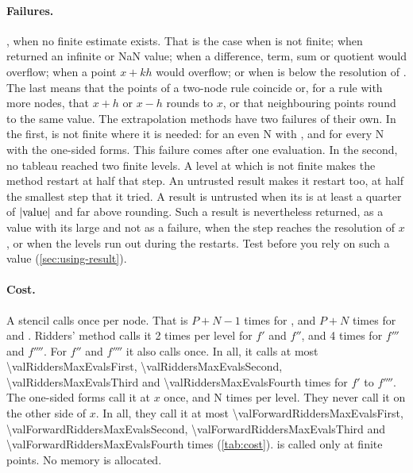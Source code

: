 \paragraph{Failures.} , when no finite estimate exists. That is the case when  is not
finite; when  returned an infinite or NaN value; when a difference, term, sum or quotient would overflow; when
a point $x + k h$ would overflow; or when  is below the resolution of . The last means that the points
of a two-node rule coincide or, for a rule with more nodes, that $x + h$ or $x - h$ rounds to $x$, or that
neighbouring points round to the same value. The extrapolation methods have two failures of their own. In the first,
 is not finite where it is needed: for an even N with , and for every N with the one-sided
forms. This failure comes after one evaluation. In the second, no tableau reached two finite levels. A level at which
 is not finite makes the method restart at half that step. An untrusted result makes it restart too, at half
the smallest step that it tried. A result is untrusted when its  is at least a quarter of
$\lvert \text{value} \rvert$ and far above rounding. Such a result is nevertheless returned, as a value with its large
 and not as a failure, when the step reaches the resolution of $x$, or when the levels run out during
the restarts. Test  before you rely on such a value (\cref{sec:using-result}).

\paragraph{Cost.} A stencil calls  once per node. That is $P + N - 1$ times for , and
$P + N$ times for  and . Ridders' method calls it 2 times per level for $f'$ and
$f''$, and 4 times for $f'''$ and $f''''$. For $f''$ and $f''''$ it also calls  once. In all, it calls
 at most \num{\valRiddersMaxEvalsFirst}, \num{\valRiddersMaxEvalsSecond}, \num{\valRiddersMaxEvalsThird}
and \num{\valRiddersMaxEvalsFourth} times for $f'$ to $f''''$. The one-sided forms call it at $x$ once, and N times
per level. They never call it on the other side of $x$. In all, they call it at most
\num{\valForwardRiddersMaxEvalsFirst}, \num{\valForwardRiddersMaxEvalsSecond},
\num{\valForwardRiddersMaxEvalsThird} and \num{\valForwardRiddersMaxEvalsFourth} times (\cref{tab:cost}). 
is called only at finite points. No memory is allocated.

